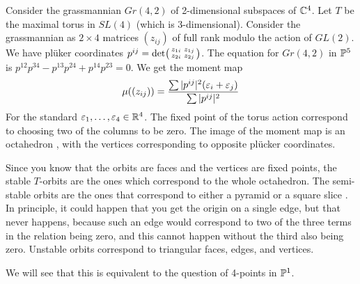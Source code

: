\begin{example}
 Consider the grassmannian $Gr(4,2)$ of 2-dimensional subspaces of $\mathbb{C}^4$. Let $T$ be the maximal torus in $SL(4)$ (which is 3-dimensional). Consider the grassmannian as $2\times 4$ matrices $(z_{ij})$ of full rank modulo the action of $GL(2)$. We have pl\"uker coordinates $p^{ij}=\det\bigl(\begin{smallmatrix} z_{1i}& z_{1j}\\ z_{2i}&z_{2j} \end{smallmatrix}\bigr)$. The equation for $Gr(4,2)$ in $\mathbb{P}^5$ is $p^{12}p^{34}-p^{13}p^{24}+p^{14}p^{23}=0$. We get the moment map
 \[
  \mu((z_{ij})) = \frac{\sum |p^{ij}|^2 (\varepsilon_i+\varepsilon_j)}{\sum |p^{ij}|^2}
 \]
 For the standard $\varepsilon_1,\dots, \varepsilon_4\in \mathbb{R}^4$. The fixed point of the torus action correspond to choosing two of the columns to be zero. The image of the moment map is an octahedron , with the vertices corresponding to opposite pl\"ucker coordinates.
 
 Since you know that the orbits are faces and the vertices are fixed points, the stable $T$-orbits are the ones which correspond to the whole octahedron. The semi-stable orbits are the ones that correspond to either a pyramid or a square slice  . In principle, it could happen that you get the origin on a single edge, but that never happens, because such an edge would correspond to two of the three terms in the relation being zero, and this cannot happen without the third also being zero. Unstable orbits correspond to triangular faces, edges, and vertices.
 
 We will see that this is equivalent to the question of 4-points in $\mathbb{P}^1$.
\end{example}


